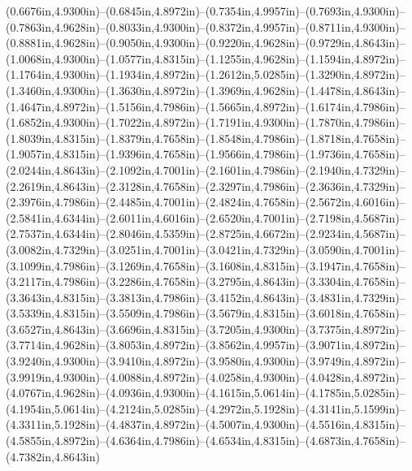 (0.6676in,4.9300in)--(0.6845in,4.8972in)--(0.7354in,4.9957in)--(0.7693in,4.9300in)--(0.7863in,4.9628in)--(0.8033in,4.9300in)--(0.8372in,4.9957in)--(0.8711in,4.9300in)--(0.8881in,4.9628in)--(0.9050in,4.9300in)--(0.9220in,4.9628in)--(0.9729in,4.8643in)--(1.0068in,4.9300in)--(1.0577in,4.8315in)--(1.1255in,4.9628in)--(1.1594in,4.8972in)--(1.1764in,4.9300in)--(1.1934in,4.8972in)--(1.2612in,5.0285in)--(1.3290in,4.8972in)--(1.3460in,4.9300in)--(1.3630in,4.8972in)--(1.3969in,4.9628in)--(1.4478in,4.8643in)--(1.4647in,4.8972in)--(1.5156in,4.7986in)--(1.5665in,4.8972in)--(1.6174in,4.7986in)--(1.6852in,4.9300in)--(1.7022in,4.8972in)--(1.7191in,4.9300in)--(1.7870in,4.7986in)--(1.8039in,4.8315in)--(1.8379in,4.7658in)--(1.8548in,4.7986in)--(1.8718in,4.7658in)--(1.9057in,4.8315in)--(1.9396in,4.7658in)--(1.9566in,4.7986in)--(1.9736in,4.7658in)--(2.0244in,4.8643in)--(2.1092in,4.7001in)--(2.1601in,4.7986in)--(2.1940in,4.7329in)--(2.2619in,4.8643in)--(2.3128in,4.7658in)--(2.3297in,4.7986in)--(2.3636in,4.7329in)--(2.3976in,4.7986in)--(2.4485in,4.7001in)--(2.4824in,4.7658in)--(2.5672in,4.6016in)--(2.5841in,4.6344in)--(2.6011in,4.6016in)--(2.6520in,4.7001in)--(2.7198in,4.5687in)--(2.7537in,4.6344in)--(2.8046in,4.5359in)--(2.8725in,4.6672in)--(2.9234in,4.5687in)--(3.0082in,4.7329in)--(3.0251in,4.7001in)--(3.0421in,4.7329in)--(3.0590in,4.7001in)--(3.1099in,4.7986in)--(3.1269in,4.7658in)--(3.1608in,4.8315in)--(3.1947in,4.7658in)--(3.2117in,4.7986in)--(3.2286in,4.7658in)--(3.2795in,4.8643in)--(3.3304in,4.7658in)--(3.3643in,4.8315in)--(3.3813in,4.7986in)--(3.4152in,4.8643in)--(3.4831in,4.7329in)--(3.5339in,4.8315in)--(3.5509in,4.7986in)--(3.5679in,4.8315in)--(3.6018in,4.7658in)--(3.6527in,4.8643in)--(3.6696in,4.8315in)--(3.7205in,4.9300in)--(3.7375in,4.8972in)--(3.7714in,4.9628in)--(3.8053in,4.8972in)--(3.8562in,4.9957in)--(3.9071in,4.8972in)--(3.9240in,4.9300in)--(3.9410in,4.8972in)--(3.9580in,4.9300in)--(3.9749in,4.8972in)--(3.9919in,4.9300in)--(4.0088in,4.8972in)--(4.0258in,4.9300in)--(4.0428in,4.8972in)--(4.0767in,4.9628in)--(4.0936in,4.9300in)--(4.1615in,5.0614in)--(4.1785in,5.0285in)--(4.1954in,5.0614in)--(4.2124in,5.0285in)--(4.2972in,5.1928in)--(4.3141in,5.1599in)--(4.3311in,5.1928in)--(4.4837in,4.8972in)--(4.5007in,4.9300in)--(4.5516in,4.8315in)--(4.5855in,4.8972in)--(4.6364in,4.7986in)--(4.6534in,4.8315in)--(4.6873in,4.7658in)--(4.7382in,4.8643in) 